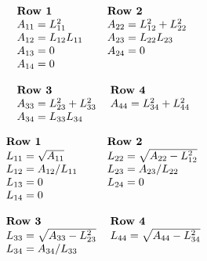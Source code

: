 \documentclass{report}
\begin{document}
\begin{equation}
  \begin{array}{ll}
    \mbox{\bf Row 1}       & \mbox{\bf Row 2}                       \\
    A_{11} = L_{11}^2      & A_{22} = L_{12}^2      + L_{22}^2      \\
    A_{12} = L_{12} L_{11} & A_{23} = L_{22} L_{23}                 \\
    A_{13} = 0             & A_{24} = 0                             \\
    A_{14} = 0             &                                        \\ 
                           &                                        \\
    \mbox{\bf Row 3}             & \; \mbox{\bf Row 4}              \\
    A_{33} = L_{23}^2 + L_{33}^2 & \; A_{44} = L_{34}^2 + L_{44}^2  \\
    A_{34} = L_{33} L_{34}       & \; 
  \end{array}
\end{equation}

\begin{equation}
  \begin{array}{ll}
    \mbox{\bf Row 1}         & \mbox{\bf Row 2}                  \\
    L_{11} = \sqrt{A_{11}}   & L_{22} = \sqrt{A_{22} - L_{12}^2} \\
    L_{12} = A_{12} / L_{11} & L_{23} = A_{23}/L_{22}            \\
    L_{13} = 0               & L_{24} = 0                        \\
    L_{14} = 0               &                                   \\ 
                             &                                   \\
    \mbox{\bf Row 3}                  & \; \mbox{\bf Row 4}                  \\
    L_{33} = \sqrt{A_{33} - L_{23}^2} & \; L_{44} = \sqrt{A_{44} - L_{34}^2} \\
    L_{34} = A_{34}/L_{33}            & \; 
  \end{array}
\end{equation}

\clearpage

\end{document}
